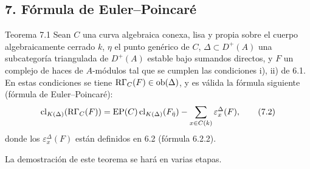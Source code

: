 \subsection*{7. Fórmula de Euler--Poincaré}

\begin{statement}{Teorema 7.1}
Sean $C$ una curva algebraica conexa, lisa y propia sobre el cuerpo algebraicamente cerrado $k$, $\eta$ el punto genérico de $C$, $\Delta\subset D^+(A)$ una subcategoría triangulada de $D^+(A)$ estable bajo sumandos directos, y $F$ un complejo de haces de $A$-módulos tal que se cumplen las condiciones i), ii) de 6.1. En estas condiciones se tiene $\mathrm{R}\Gamma_C(F)\in\operatorname{ob}(\Delta)$, y es válida la fórmula siguiente (fórmula de Euler--Poincaré):
\[
\operatorname{cl}_{K(\Delta)}(\mathrm{R}\Gamma_C(F))
=
\operatorname{EP}(C)\operatorname{cl}_{K(\Delta)}(F_{\bar\eta})
-\sum_{x\in C(k)}\varepsilon_x^\Delta(F),
\tag{7.2}
\]
donde los $\varepsilon_x^\Delta(F)$ están definidos en 6.2 (fórmula 6.2.2).
\end{statement}

La demostración de este teorema se hará en varias etapas.

